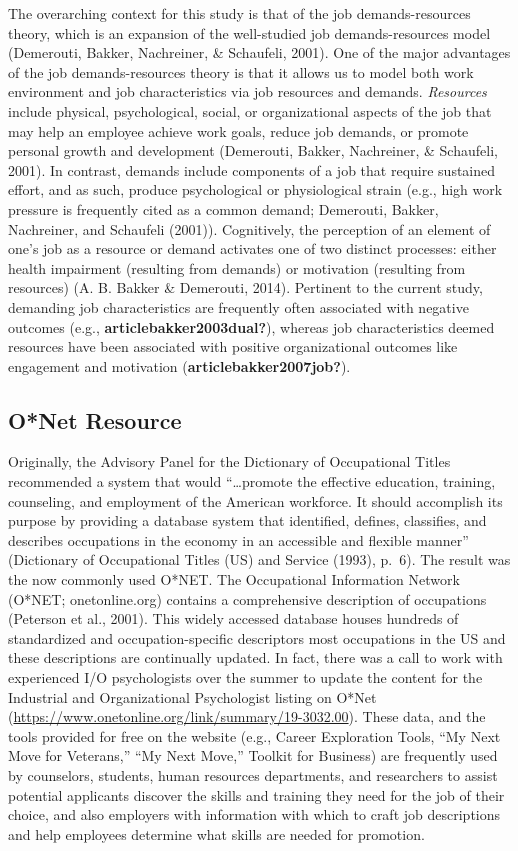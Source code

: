 \documentclass[
  english,
  man]{apa6}
\begin{document}
The overarching context for this study is that of the job demands-resources theory, which is an expansion of the well-studied job demands-resources model (Demerouti, Bakker, Nachreiner, \& Schaufeli, 2001). One of the major advantages of the job demands-resources theory is that it allows us to model both work environment and job characteristics via job resources and demands. \emph{Resources} include physical, psychological, social, or organizational aspects of the job that may help an employee achieve work goals, reduce job demands, or promote personal growth and development (Demerouti, Bakker, Nachreiner, \& Schaufeli, 2001). In contrast, demands include components of a job that require sustained effort, and as such, produce psychological or physiological strain (e.g., high work pressure is frequently cited as a common demand; Demerouti, Bakker, Nachreiner, and Schaufeli (2001)).
Cognitively, the perception of an element of one's job as a resource or demand activates one of two distinct processes: either health impairment (resulting from demands) or motivation (resulting from resources) (A. B. Bakker \& Demerouti, 2014). Pertinent to the current study, demanding job characteristics are frequently often associated with negative outcomes (e.g., \textbf{articlebakker2003dual?}), whereas job characteristics deemed resources have been associated with positive organizational outcomes like engagement and motivation (\textbf{articlebakker2007job?}).

\hypertarget{onet-resource}{%
\subsection{O*Net Resource}\label{onet-resource}}

Originally, the Advisory Panel for the Dictionary of Occupational Titles recommended a system that would ``\ldots promote the effective education, training, counseling, and employment of the American workforce. It should accomplish its purpose by providing a database system that identified, defines, classifies, and describes occupations in the economy in an accessible and flexible manner'' (Dictionary of Occupational Titles (US) and Service (1993), p.~6). The result was the now commonly used O*NET. The Occupational Information Network (O*NET; onetonline.org) contains a comprehensive description of occupations (Peterson et al., 2001). This widely accessed database houses hundreds of standardized and occupation-specific descriptors most occupations in the US and these descriptions are continually updated. In fact, there was a call to work with experienced I/O psychologists over the summer to update the content for the Industrial and Organizational Psychologist listing on O*Net (\url{https://www.onetonline.org/link/summary/19-3032.00}). These data, and the tools provided for free on the website (e.g., Career Exploration Tools, ``My Next Move for Veterans,'' ``My Next Move,'' Toolkit for Business) are frequently used by counselors, students, human resources departments, and researchers to assist potential applicants discover the skills and training they need for the job of their choice, and also employers with information with which to craft job descriptions and help employees determine what skills are needed for promotion.
\end{document}
